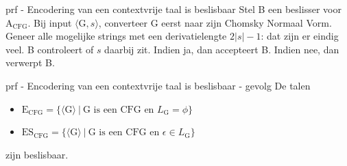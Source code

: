 \begin{prf}{prf - Encodering van een contextvrije taal is beslisbaar}
    Stel B een beslisser voor $\text{A}_{\text{CFG}}$. Bij input $\langle \text{G}, s\rangle$, converteer G eerst naar zijn Chomsky Normaal Vorm. Geneer alle mogelijke strings met een derivatielengte $2|s| - 1$: dat zijn er eindig veel. B controleert of $s$ daarbij zit. Indien ja, dan accepteert B. Indien nee, dan verwerpt B.
\end{prf}

\begin{lem}{prf - Encodering van een contextvrije taal is beslisbaar - gevolg}
    De talen
    \begin{itemize}
        \item 
            $ \text{E}_{\text{CFG}} = \{\langle \text{G} \rangle\  | \ \text{G is een CFG en $L_{\text{G}} = \phi$} \}$
        \item 
            $ \text{ES}_{\text{CFG}} = \{\langle \text{G} \rangle\  | \ \text{G is een CFG en $\epsilon \in L_{\text{G}}$} \}$
    \end{itemize}
    zijn beslisbaar.
\end{lem}

